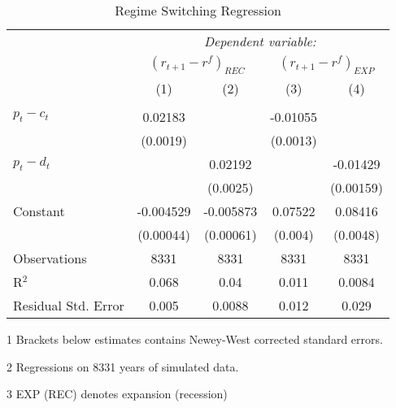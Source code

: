 \begin{table}[H]
\centering   
  \caption{Regime Switching Regression}           
  \label{tab:RSregress}     
  \begin{threeparttable}
\begin{tabular}{@{\hspace{5pt}}l@{\hspace{5pt}}cccc} 
\toprule 
 & \multicolumn{4}{c}{\textit{Dependent variable:}} \\ 
 & \multicolumn{2}{c}{$\left(r_{t+1}-r^f\right)_{REC}$} & \multicolumn{2}{c}{$\left(r_{t+1}-r^f\right)_{EXP}$} \\ 
 \cmidrule(rr){2-5}
 & (1)   &   (2) & (3) & (4) \\ 
\midrule  
\\[-2.1ex] $ p_t - c_t $ & 0.02183&  &-0.01055   & \\ 
  & (0.0019) & &(0.0013) & \\ 
 \addlinespace 
 $p_t - d_t$ &  & 0.02192 & &-0.01429 \\
 & & (0.0025) & &(0.00159) \\
 \addlinespace 
 Constant &-0.004529 &-0.005873 &0.07522 &0.08416 \\ 
  &(0.00044) &(0.00061) &(0.004) &(0.0048) \\ 
 \addlinespace 
\midrule  
Observations & 8331 & 8331 & 8331 &8331\\ 
R$^{2}$ &0.068 & 0.04 & 0.011 &0.0084\\ 
Residual Std. Error &0.005 & 0.0088 &0.012 & 0.029  \\ 
\bottomrule 
\end{tabular} 
\begin{tablenotes}
\footnotesize{
\item[1] Brackets below estimates contains Newey-West corrected standard errors. 
\item[2] Regressions on 8331 years of simulated data.
\item[3] EXP (REC) denotes expansion (recession)
}
\end{tablenotes}
\end{threeparttable}
\end{table} 
